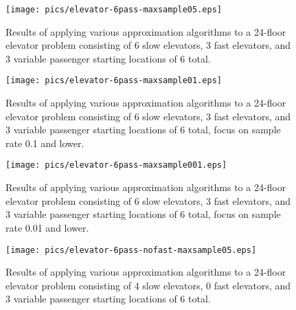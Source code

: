 \begin{figure}
\begin{center}
\texttt{[image: pics/elevator-6pass-maxsample05.eps]}
\caption{Results of applying various approximation algorithms to a 24-floor elevator problem consisting of 6 slow elevators, 3 fast elevators, and 3 variable passenger starting locations of 6 total.}
\label{fig:elevator-6pass-maxsample05}
\end{center}
\end{figure}

\begin{figure}
\begin{center}
\texttt{[image: pics/elevator-6pass-maxsample01.eps]}
\caption{Results of applying various approximation algorithms to a 24-floor elevator problem consisting of 6 slow elevators, 3 fast elevators, and 3 variable passenger starting locations of 6 total, focus on sample rate 0.1 and lower.}
\label{fig:elevator-6pass-maxsample01}
\end{center}
\end{figure}

\begin{figure}
\begin{center}
\texttt{[image: pics/elevator-6pass-maxsample001.eps]}
\caption{Results of applying various approximation algorithms to a 24-floor elevator problem consisting of 6 slow elevators, 3 fast elevators, and 3 variable passenger starting locations of 6 total, focus on sample rate 0.01 and lower.}
\label{fig:elevator-6pass-maxsample001}
\end{center}
\end{figure}






\begin{figure}
\begin{center}
\texttt{[image: pics/elevator-6pass-nofast-maxsample05.eps]}
\caption{Results of applying various approximation algorithms to a 24-floor elevator problem consisting of 4 slow elevators, 0 fast elevators, and 3 variable passenger starting locations of 6 total.}
\label{fig:elevator-6pass-nofast-maxsample05}
\end{center}
\end{figure}


